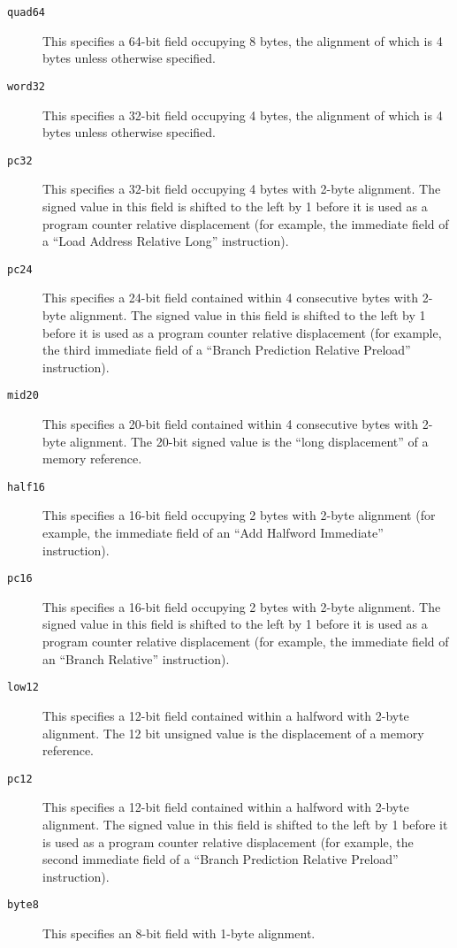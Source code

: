 \documentclass[english,11pt,twoside,toc=bib,toc=idx]{scrreprt}
\begin{document}
\begin{description}
\ifzseries
\item[\texttt{quad64}] This specifies a 64-bit field occupying 8
  bytes, the alignment of which is 4 bytes unless otherwise specified.
\fi
\item[\texttt{word32}] This specifies a 32-bit field occupying 4 bytes, the
  alignment of which is 4 bytes unless otherwise specified.
\ifzseries
\item[\texttt{pc32}] This specifies a 32-bit field occupying 4 bytes
  with 2-byte alignment.  The signed value in this field is shifted to
  the left by 1 before it is used as a program counter relative
  displacement (for example, the immediate field of a ``Load Address
  Relative Long'' instruction).
\item[\texttt{pc24}] This specifies a 24-bit field contained within 4
  consecutive bytes with 2-byte alignment.  The signed value in this field
  is shifted to the left by 1 before it is used as a program counter
  relative displacement (for example, the third immediate field of a
  ``Branch Prediction Relative Preload'' instruction).
\item[\texttt{mid20}] This specifies a 20-bit field contained within 4
  consecutive bytes with 2-byte alignment.  The 20-bit signed value is the
  ``long displacement'' of a memory reference.
\fi
\item[\texttt{half16}] This specifies a 16-bit field occupying 2 bytes with
  2-byte alignment (for example, the immediate field of an ``Add
  Halfword Immediate'' instruction).
\item[\texttt{pc16}] This specifies a 16-bit field occupying 2 bytes
  with 2-byte alignment.  The signed value in this field is shifted to
  the left by 1 before it is used as a program counter relative
  displacement (for example, the immediate field of an ``Branch
  Relative'' instruction).
\item[\texttt{low12}] This specifies a 12-bit field contained within a
  halfword with 2-byte alignment.  The 12 bit unsigned value is the
  displacement of a memory reference.
\item[\texttt{pc12}] This specifies a 12-bit field contained within a
  halfword with 2-byte alignment.  The signed value in this field is
  shifted to the left by 1 before it is used as a program counter relative
  displacement (for example, the second immediate field of a ``Branch
  Prediction Relative Preload'' instruction).
\item[\texttt{byte8}] This specifies an 8-bit field with 1-byte
  alignment.
\end{description}
\end{document}
